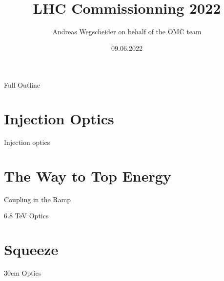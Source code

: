 \documentclass[11pt,usenames,dvipsnames]{beamer}
\author[OMC]{Andreas Wegscheider on behalf of the OMC team}
\title[LHC 2022]{LHC Commissionning 2022}
\institute{CERN}
\date[09.06.22]{09.06.2022}
\begin{document}


\begin{frame}
    \titlepage
\end{frame}


\begin{frame}{Full Outline}
\tableofcontents
\end{frame}

\section{Injection Optics}
\begin{frame}{Injection optics}

\end{frame}

\section{The Way to Top Energy}

\begin{frame}{Coupling in the Ramp}

\end{frame}

\begin{frame}{6.8 TeV Optics}

\end{frame}

\section{Squeeze}

\begin{frame}{30cm Optics}
    
\end{frame}

\end{document}
